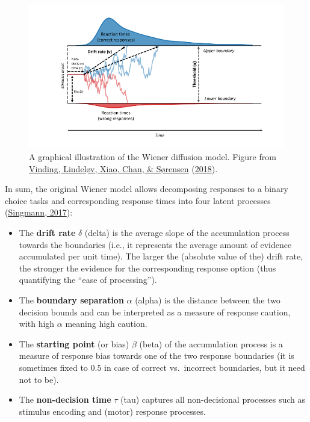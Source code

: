 \documentclass[
  11pt,
  english,
  ,doc,floatsintext]{apa6}
\begin{document}
\begin{figure}[!htb]

{\centering \includegraphics[width=0.75\linewidth]{figures/wiener_figure} 

}

\caption{A graphical illustration of the Wiener diffusion model. Figure from \protect\hyperlink{ref-vinding_volition_2018}{Vinding, Lindeløv, Xiao, Chan, \& Sørensen} (\protect\hyperlink{ref-vinding_volition_2018}{2018}).}\label{fig:wiener-figure}
\end{figure}

In sum, the original Wiener model allows decomposing responses to a binary choice tasks and corresponding response times into four latent processes (\protect\hyperlink{ref-singmann_diffusionux2fwiener_2017}{Singmann, 2017}):

\begin{itemize}
\item
  The \textbf{drift rate} \(\delta\) (delta) is the average slope of the accumulation process towards the boundaries (i.e., it represents the average amount of evidence accumulated per unit time). The larger the (absolute value of the) drift rate, the stronger the evidence for the corresponding response option (thus quantifying the ``ease of processing'').
\item
  The \textbf{boundary separation} \(\alpha\) (alpha) is the distance between the two decision bounds and can be interpreted as a measure of response caution, with high \(\alpha\) meaning high caution.
\item
  The \textbf{starting point} (or bias) \(\beta\) (beta) of the accumulation process is a measure of response bias towards one of the two response boundaries (it is sometimes fixed to \(0.5\) in case of correct vs.~incorrect boundaries, but it need not to be).
\item
  The \textbf{non-decision time} \(\tau\) (tau) captures all non-decisional processes such as stimulus encoding and (motor) response processes.
\end{itemize}
\end{document}
